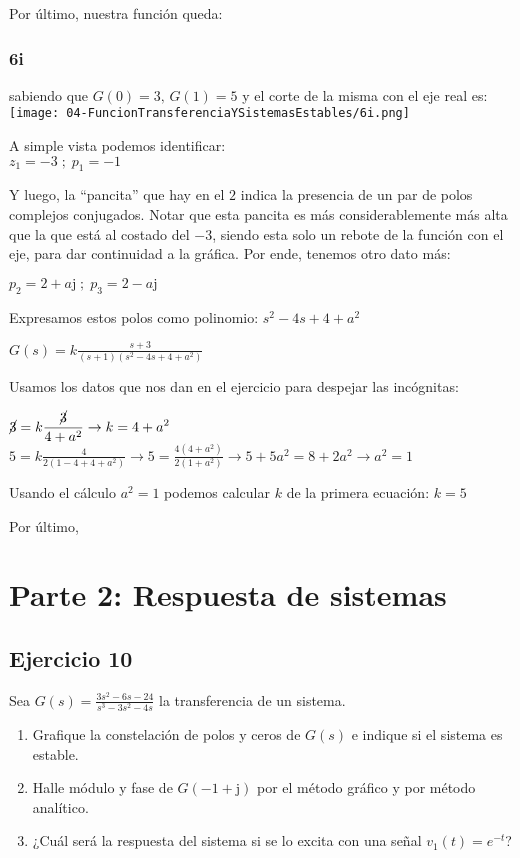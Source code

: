 \documentclass[11pt]{article}
\def\imj{\mathrm{j}}
\begin{document}
	Por último, nuestra función queda: 
	
	\subsubsection{6i}
	sabiendo que $G(0)=3\text{, }G(1)=5$ y el corte de la misma con el eje real es:\\
	\texttt{[image: 04-FuncionTransferenciaYSistemasEstables/6i.png]}
	
	A simple vista podemos identificar:\\
	$z_1=-3 \;;\; p_1=-1$
	
	Y luego, la ``pancita'' que hay en el $2$ indica la presencia de un par de polos complejos conjugados. Notar que esta pancita es más considerablemente más alta que la que está al costado del $-3$, siendo esta solo un rebote de la función con el eje, para dar continuidad a la gráfica. Por ende, tenemos otro dato más:
	
	$p_2=2+a\imj \;;\;p_3=2-a\imj$
	
	Expresamos estos polos como polinomio: $s^2-4s+4+a^2$
	
	$\displaystyle G(s)=k\frac{s+3}{(s+1)(s^2-4s+4+a^2)}$
	
	Usamos los datos que nos dan en el ejercicio para despejar las incógnitas:
	
	$\displaystyle \cancel{3}=k\frac{\cancel{3}}{4+a^2} \rightarrow k=4+a^2$\\
	$\displaystyle 5=k\frac{4}{2(1-4+4+a^2)} \rightarrow 5=\frac{4(4+a^2)}{2(1+a^2)} \rightarrow 5+5a^2=8+2a^2 \rightarrow \boxed{a^2=1}$
	
	Usando el cálculo $a^2=1$ podemos calcular $k$ de la primera ecuación: $k=5$
	
	Por último, 
	
	\section{Parte 2: Respuesta de sistemas}
	\subsection{Ejercicio 10}
	Sea $\displaystyle G(s)=\frac{3s^2-6s-24}{s^3-3s^2-4s}$ la transferencia de un sistema.
	
	\begin{enumerate}[label=(\alph*)]
		\item Grafique la constelación de polos y ceros de $G(s)$ e indique si el sistema es estable.
		\item Halle módulo y fase de $G(-1+\imj)$ por el método gráfico y por método analítico.
		\item ¿Cuál será la respuesta del sistema si se lo excita con una señal $v_1(t)=e^{-t}$?
	\end{enumerate}
\end{document}
